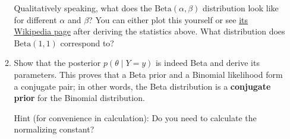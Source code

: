 \documentclass[submit]{harvardml}
\DeclareMathOperator*{\mean}{\mathbb{E}}
\begin{document}
\begin{problem}
\begin{enumerate}
\begin{enumerate}

            Qualitatively speaking, what does the $\mathrm{Beta}(\alpha, \beta)$ distribution look like for different $\alpha$ and $\beta$? You can either plot this yourself or see \href{https://en.wikipedia.org/wiki/Beta_distribution}{its Wikipedia page} after deriving the statistics above. What distribution does $\mathrm{Beta}(1, 1)$ correspond to?

      \item
            Show that the posterior
            \(p(\theta \mid Y=y)\) is indeed Beta and derive its parameters. This proves that a Beta prior and a Binomial likelihood form a conjugate pair; in other words, the Beta distribution is a \textbf{conjugate prior} for the Binomial distribution.

            Hint (for convenience in calculation): Do you need to calculate the normalizing constant?


    \end{enumerate}

\end{enumerate}
\end{problem}

\newpage
\end{document}
